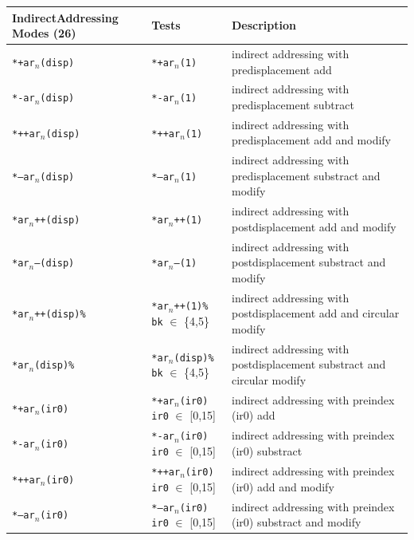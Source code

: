 \begin{table}[!p]
\begin{center}
	\small
	\begin{tabular}{|p{2.3cm}|p{2.3cm}|p{11.0cm}|}
	\hline
	\textbf{Indirect\newline Addressing \newline Modes (26)} & \textbf{Tests} & \textbf{Description}\\
	\hline
	\texttt{*+ar$_n$(disp)} & \texttt{*+ar$_n$(1)} & indirect addressing with predisplacement add\\
	\hline
	\texttt{*-ar$_n$(disp)} & \texttt{*-ar$_n$(1)} & indirect addressing with predisplacement subtract\\
	\hline
	\texttt{*++ar$_n$(disp)} & \texttt{*++ar$_n$(1)} & indirect addressing with predisplacement add and modify\\
	\hline
	\texttt{*--ar$_n$(disp)} & \texttt{*--ar$_n$(1)} & indirect addressing with predisplacement substract and modify\\
	\hline
	\texttt{*ar$_n$++(disp)} & \texttt{*ar$_n$++(1)} & indirect addressing with postdisplacement add and modify\\
	\hline
	\texttt{*ar$_n$--(disp)} & \texttt{*ar$_n$--(1)} & indirect addressing with postdisplacement substract and modify\\
	\hline
	\texttt{*ar$_n$++(disp)\%} & \texttt{*ar$_n$++(1)\%} \newline \texttt{bk} $\in$ \{4,5\} & indirect addressing with postdisplacement add and circular modify\\
	\hline
	\texttt{*ar$_n$(disp)\%} & \texttt{*ar$_n$(disp)\%} \newline \texttt{bk} $\in$ \{4,5\} & indirect addressing with postdisplacement substract and circular modify\\
	\hline
	\texttt{*+ar$_n$(ir0)} & \texttt{*+ar$_n$(ir0)} \newline \texttt{ir0} $\in$ [0,15] & indirect addressing with preindex (ir0) add\\
	\hline
	\texttt{*-ar$_n$(ir0)} & \texttt{*-ar$_n$(ir0)} \newline \texttt{ir0} $\in$ [0,15] & indirect addressing with preindex (ir0) substract\\
	\hline
	\texttt{*++ar$_n$(ir0)} & \texttt{*++ar$_n$(ir0)} \newline \texttt{ir0} $\in$ [0,15] & indirect addressing with preindex (ir0) add and modify\\
	\hline
	\texttt{*--ar$_n$(ir0)} & \texttt{*--ar$_n$(ir0)} \newline \texttt{ir0} $\in$ [0,15] & indirect addressing with preindex (ir0) substract and modify\\

\end{tabular}
\end{center}
\end{table}
